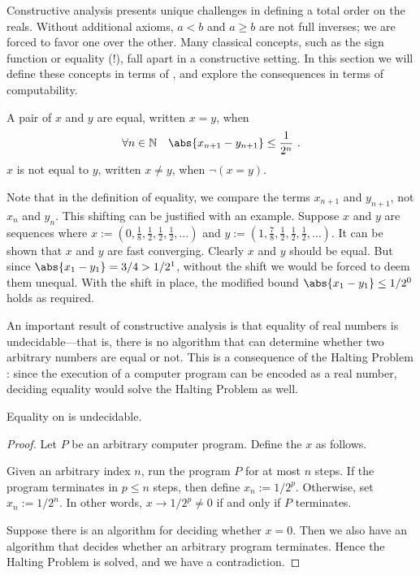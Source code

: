 \documentclass[leqno]{report}
\begin{document}
Constructive analysis presents unique challenges in defining a total order on the reals. Without additional axioms, $a < b$ and $a \geq b$ are not full inverses; we are forced to favor one over the other. Many classical concepts, such as the sign function or equality (!), fall apart in a constructive setting. In this section we will define these concepts in terms of \FCCS{}, and explore the consequences in terms of computability.

\begin{Definition}[Equality]
    A pair of \FCCS{} $x$ and $y$ are equal, written $x = y$, when
    \[
        \fa{n \in \N}{\abs{x_{n+1} - y_{n+1}} \leq \frac{1}{2^n}} \ .
    \]
    $x$ is not equal to $y$, written $x \neq y$, when $\neg (x = y)$.
\end{Definition}

Note that in the definition of equality, we compare the terms $x_{n+1}$ and $y_{n+1}$, not $x_n$ and $y_n$. This shifting can be justified with an example. Suppose $x$ and $y$ are sequences where $x := (0, \frac{1}{8}, \frac{1}{2}, \frac{1}{2}, \frac{1}{2}, \ldots)$ and $y := (1, \frac{7}{8}, \frac{1}{2}, \frac{1}{2}, \frac{1}{2}, \ldots)$. It can be shown that $x$ and $y$ are fast converging. Clearly $x$ and $y$ should be equal. But since $\abs{x_1 - y_1} = 3/4 > 1/2^1$, without the shift we would be forced to deem them unequal. With the shift in place, the modified bound $\abs{x_1 - y_1} \leq 1/2^0$ holds as required.

An important result of constructive analysis is that equality of real numbers is undecidable---that is, there is no algorithm that can determine whether two arbitrary numbers are equal or not. This is a consequence of the Halting Problem \citep{turing1936computable}: since the execution of a computer program can be encoded as a real number, deciding equality would solve the Halting Problem as well.

\begin{Proposition} \label{equality_undecidable}
    Equality on \FCCS{} is undecidable.
\end{Proposition}

\begin{proof}
    Let $P$ be an arbitrary computer program. Define the \FCCS{} $x$ as follows.

    Given an arbitrary index $n$, run the program $P$ for at most $n$ steps. If the program terminates in $p \leq n$ steps, then define $x_n := 1/2^p$. Otherwise, set $x_n := 1/2^n$. In other words, $x \rightarrow 1/2^p \neq 0$ if and only if $P$ terminates.

    Suppose there is an algorithm for deciding whether $x = 0$. Then we also have an algorithm that decides whether an arbitrary program terminates. Hence the Halting Problem is solved, and we have a contradiction.
\end{proof}
\end{document}
